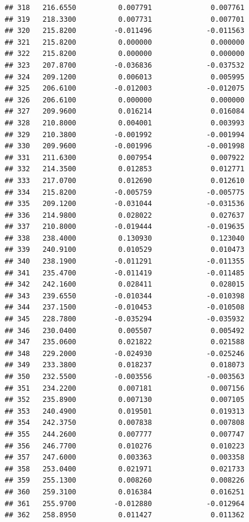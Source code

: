 \documentclass[
]{article}
\begin{document}
\begin{verbatim}
## 318   216.6550          0.007791              0.007761
## 319   218.3300          0.007731              0.007701
## 320   215.8200         -0.011496             -0.011563
## 321   215.8200          0.000000              0.000000
## 322   215.8200          0.000000              0.000000
## 323   207.8700         -0.036836             -0.037532
## 324   209.1200          0.006013              0.005995
## 325   206.6100         -0.012003             -0.012075
## 326   206.6100          0.000000              0.000000
## 327   209.9600          0.016214              0.016084
## 328   210.8000          0.004001              0.003993
## 329   210.3800         -0.001992             -0.001994
## 330   209.9600         -0.001996             -0.001998
## 331   211.6300          0.007954              0.007922
## 332   214.3500          0.012853              0.012771
## 333   217.0700          0.012690              0.012610
## 334   215.8200         -0.005759             -0.005775
## 335   209.1200         -0.031044             -0.031536
## 336   214.9800          0.028022              0.027637
## 337   210.8000         -0.019444             -0.019635
## 338   238.4000          0.130930              0.123040
## 339   240.9100          0.010529              0.010473
## 340   238.1900         -0.011291             -0.011355
## 341   235.4700         -0.011419             -0.011485
## 342   242.1600          0.028411              0.028015
## 343   239.6550         -0.010344             -0.010398
## 344   237.1500         -0.010453             -0.010508
## 345   228.7800         -0.035294             -0.035932
## 346   230.0400          0.005507              0.005492
## 347   235.0600          0.021822              0.021588
## 348   229.2000         -0.024930             -0.025246
## 349   233.3800          0.018237              0.018073
## 350   232.5500         -0.003556             -0.003563
## 351   234.2200          0.007181              0.007156
## 352   235.8900          0.007130              0.007105
## 353   240.4900          0.019501              0.019313
## 354   242.3750          0.007838              0.007808
## 355   244.2600          0.007777              0.007747
## 356   246.7700          0.010276              0.010223
## 357   247.6000          0.003363              0.003358
## 358   253.0400          0.021971              0.021733
## 359   255.1300          0.008260              0.008226
## 360   259.3100          0.016384              0.016251
## 361   255.9700         -0.012880             -0.012964
## 362   258.8950          0.011427              0.011362

\end{verbatim}
\end{document}
